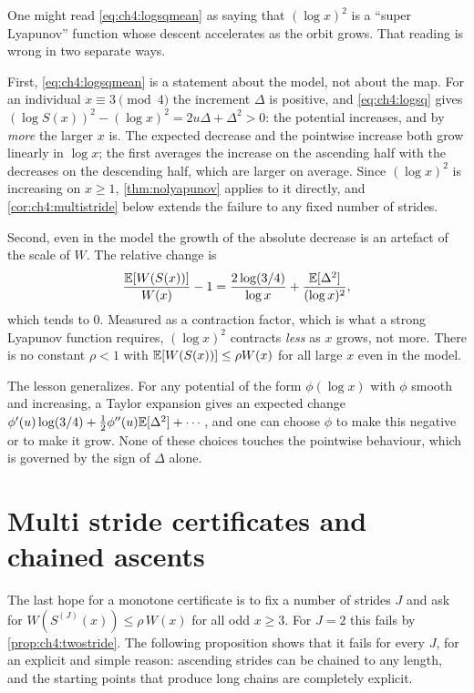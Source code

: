 One might read \eqref{eq:ch4:logsqmean} as saying that $(\log x)^2$
is a ``super Lyapunov'' function whose descent accelerates as the orbit grows.
That reading is wrong in two separate ways.

\begin{remark}\label{rem:ch4:logsqpitfall}
First, \eqref{eq:ch4:logsqmean} is a statement about the model, not about the
map.  For an individual $x\equiv3\pmod4$ the increment $\Delta$ is positive,
and \eqref{eq:ch4:logsq} gives $(\log S(x))^2-(\log x)^2=2u\Delta+\Delta^2>0$:
the potential increases, and by \emph{more} the larger $x$ is.  The expected
decrease and the pointwise increase both grow linearly in $\log x$; the first
averages the increase on the ascending half with the decreases on the descending half, which are larger on average.  Since
$(\log x)^2$ is increasing on $x\ge1$, \cref{thm:nolyapunov} applies to it
directly, and \cref{cor:ch4:multistride} below extends the failure to any
fixed number of strides.

Second, even in the model the growth of the absolute decrease is an artefact
of the scale of $W$.  The relative change is
\[
  \frac{\mathbb{E}[W(S(x))]}{W(x)}-1=\frac{2\log(3/4)}{\log x}+\frac{\mathbb{E}[\Delta^2]}{(\log x)^2},
\]
which tends to $0$.  Measured as a contraction factor, which is what a strong
Lyapunov function requires, $(\log x)^2$ contracts \emph{less} as $x$ grows,
not more.  There is no constant $\rho<1$ with
$\mathbb{E}[W(S(x))]\le\rho W(x)$ for all large $x$ even in the model.
\end{remark}

The lesson generalizes.  For any potential of the form $\phi(\log x)$ with
$\phi$ smooth and increasing, a Taylor expansion gives an expected change
$\phi'(u)\log(3/4)+\tfrac12\phi''(u)\mathbb{E}[\Delta^2]+\cdots$, and one can choose
$\phi$ to make this negative or to make it grow.  None of these choices
touches the pointwise behaviour, which is governed by the sign of $\Delta$
alone.

\section{Multi stride certificates and chained ascents}\label{sec:ch4:multi}

The last hope for a monotone certificate is to fix a number of strides $J$ and
ask for $W(S^{(J)}(x))\le\rho\,W(x)$ for all odd $x\ge3$.  For $J=2$ this
fails by \cref{prop:ch4:twostride}.  The following proposition shows that it
fails for every $J$, for an explicit and simple reason: ascending strides can
be chained to any length, and the starting points that produce long chains
are completely explicit.

